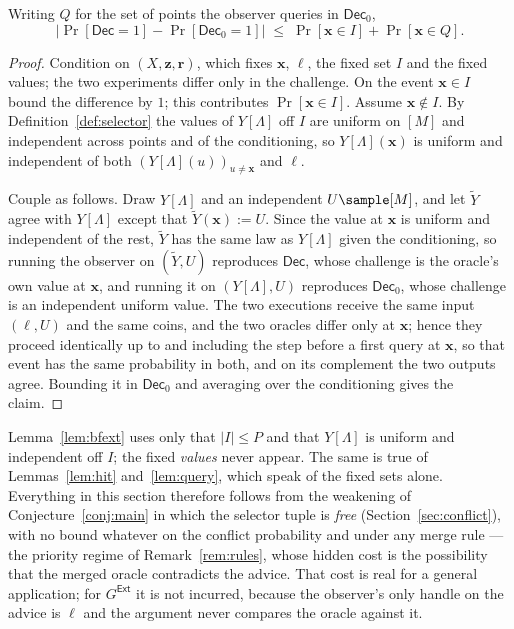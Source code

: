 \documentclass{conjura-conjecture}
\newcommand{\Prob}[1]{\Pr\!\left[#1\right]}
\newcommand{\vz}{\mathbf{z}}
\newcommand{\vr}{\mathbf{r}}
\newcommand{\vx}{\mathbf{x}}
\newcommand{\vl}{\boldsymbol{\ell}}
\newcommand{\Dec}{\mathsf{Dec}}
\newcommand{\Ext}{\mathsf{Ext}}
\begin{document}
\begin{lemma}\label{lem:bfext}
Writing $Q$ for the set of points the observer queries in $\Dec_0$,
\[
  \bigl|\Prob{\Dec = 1} - \Prob{\Dec_0 = 1}\bigr|
  \;\le\; \Prob{\vx \in I} + \Prob{\vx \in Q} .
\]
\end{lemma}

\begin{proof}
Condition on $(X,\vz,\vr)$, which fixes $\vx$, $\vl$, the fixed set $I$
and the fixed values; the two experiments differ only in the challenge. On
the event $\vx \in I$ bound the difference by $1$; this contributes
$\Prob{\vx \in I}$. Assume $\vx \notin I$. By
Definition~\ref{def:selector} the values of $Y[\Lambda]$ off $I$ are
uniform on $[M]$ and independent across points and of the conditioning, so
$Y[\Lambda](\vx)$ is uniform and independent of both
$(Y[\Lambda](u))_{u \ne \vx}$ and $\vl$.

Couple as follows. Draw $Y[\Lambda]$ and an independent $U \sample [M]$,
and let $\widetilde{Y}$ agree with $Y[\Lambda]$ except that
$\widetilde{Y}(\vx) := U$. Since the value at $\vx$ is uniform and
independent of the rest, $\widetilde{Y}$ has the same law as $Y[\Lambda]$
given the conditioning, so running the observer on $(\widetilde{Y},U)$
reproduces $\Dec$, whose challenge is the oracle's own value at $\vx$, and
running it on $(Y[\Lambda],U)$ reproduces $\Dec_0$, whose challenge is an
independent uniform value. The two executions receive the same input
$(\vl,U)$ and the same coins, and the two oracles differ only at $\vx$;
hence they proceed identically up to and including the step before a first
query at $\vx$, so that event has the same probability in both, and on its
complement the two outputs agree. Bounding it in $\Dec_0$ and averaging
over the conditioning gives the claim.
\end{proof}

\begin{remark}\label{rem:noconsistency}
Lemma~\ref{lem:bfext} uses only that $|I| \le P$ and that $Y[\Lambda]$ is
uniform and independent off $I$; the fixed \emph{values} never appear. The
same is true of Lemmas~\ref{lem:hit} and~\ref{lem:query}, which speak of
the fixed sets alone. Everything in this section therefore follows from
the weakening of Conjecture~\ref{conj:main} in which the selector tuple is
\emph{free} (Section~\ref{sec:conflict}), with no bound whatever on the
conflict probability and under any merge rule --- the priority regime of
Remark~\ref{rem:rules}, whose hidden cost is the possibility that the
merged oracle contradicts the advice. That cost is real for a general
application; for $G^{\Ext}$ it is not incurred, because the observer's
only handle on the advice is $\vl$ and the argument never compares the
oracle against it.
\end{remark}
\end{document}
